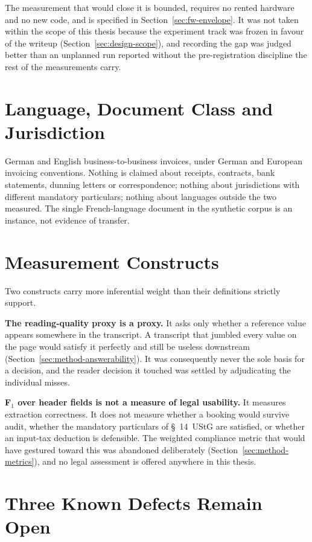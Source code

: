 The measurement that would close it is bounded, requires no rented hardware and no new code,
and is specified in Section~\ref{sec:fw-envelope}. It was not taken within the scope of this thesis
because the experiment track was frozen in favour of the writeup
(Section~\ref{sec:design-scope}), and recording the gap was judged better than an unplanned run
reported without the pre-registration discipline the rest of the measurements carry.

\section{Language, Document Class and Jurisdiction}
\label{sec:lim-scope}

German and English business-to-business invoices, under German and European invoicing
conventions. Nothing is claimed about receipts, contracts, bank statements, dunning letters or
correspondence; nothing about jurisdictions with different mandatory particulars; nothing about
languages outside the two measured. The single French-language document in the synthetic corpus is
an instance, not evidence of transfer.

\section{Measurement Constructs}
\label{sec:lim-measurement}

Two constructs carry more inferential weight than their definitions strictly support.

\textbf{The reading-quality proxy is a proxy.} It asks only whether a reference value appears
somewhere in the transcript. A transcript that jumbled every value on the page would satisfy it
perfectly and still be useless downstream (Section~\ref{sec:method-answerability}). It was
consequently never the sole basis for a decision, and the reader decision it touched was
settled by adjudicating the individual misses.

\textbf{F$_1$ over header fields is not a measure of legal usability.} It measures extraction
correctness. It does not measure whether a booking would survive audit, whether the mandatory
particulars of \S~14~\ac{UStG} are satisfied, or whether an input-tax deduction is defensible. The
weighted compliance metric that would have gestured toward this was abandoned deliberately
(Section~\ref{sec:method-metrics}), and no legal assessment is offered anywhere in this thesis.

\section{Three Known Defects Remain Open}
\label{sec:lim-open-defects}

